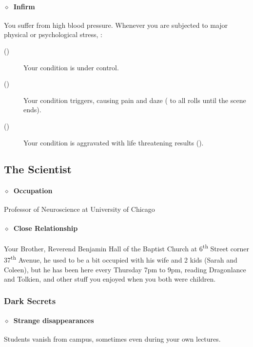 \paragraph{\(\diamond\)~Infirm}%
You suffer from high blood pressure. Whenever you are subjected to major physical or psychological stress, :
\begin{description}
 \item[()] Your condition is under control.
 \item[()] Your condition triggers, causing pain and daze ( to all rolls until the scene ends).
 \item[()] Your condition is aggravated with life threatening results ().
\end{description}
\KULTrule%

\clearpage %
\subsection{The Scientist}%
\label{sub:the_scientist}

\paragraph{\(\diamond\)~Occupation}%
Professor of Neuroscience at University of Chicago
\paragraph{\(\diamond\)~Close Relationship}%
Your Brother, Reverend Benjamin Hall of the Baptist Church at 6\textsuperscript{th} Street corner 37\textsuperscript{th}
Avenue, he used to be a bit occupied with his wife and 2 kids (Sarah and Coleen), but he has been here every Thursday 7pm to 9pm, reading Dragonlance and Tolkien, and other stuff you enjoyed when you both were children.


\subsubsection{Dark Secrets}%
\label{ssub:scientist_dark_secrets}

\paragraph{\(\diamond\)~Strange disappearances}%
Students vanish from campus, sometimes even during your own lectures.

